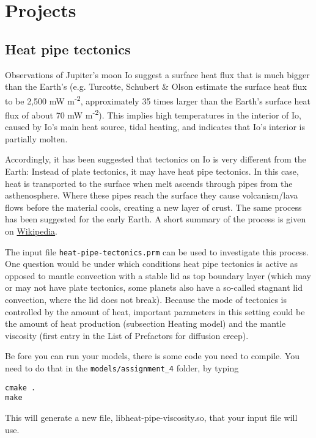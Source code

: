 \documentclass[notitlepage]{article}
\begin{document}
\section{Projects}

\subsection{Heat pipe tectonics}

Observations of Jupiter's moon Io suggest a surface heat flux that is much bigger than the Earth's 
(e.g. Turcotte, Schubert \& Olson estimate the surface heat flux to be 2,500 mW m\textsuperscript{-2},
approximately 35 times larger than the Earth's surface heat flux of about 70 mW m\textsuperscript{-2}).
This implies high temperatures in the interior of Io, caused by Io's main heat source, tidal heating,  
and indicates that Io's interior is partially molten. 

Accordingly, it has been suggested that tectonics on Io is very different from the Earth: 
Instead of plate tectonics, it may have heat pipe tectonics. In this case, heat is transported to the 
surface when melt ascends through pipes from the asthenosphere. Where these pipes reach the surface they cause volcanism/lava flows 
before the material cools, creating a new layer of crust. The same process has been suggested for the early Earth. 
A short summary of the process is given on \href{https://en.wikipedia.org/wiki/Heat-pipe_tectonics}{Wikipedia}.

The input file \texttt{heat-pipe-tectonics.prm} can be used to investigate this process. 
One question would be under which conditions heat pipe tectonics is active as opposed to mantle convection with 
a stable lid as top boundary layer (which may or may not have plate tectonics, some planets also have a so-called
stagnant lid convection, where the lid does not break). 
Because the mode of tectonics is controlled by the amount of heat, important parameters in this setting could be
the amount of heat production (subsection Heating model) and the mantle viscosity (first entry in the List of
Prefactors for diffusion creep). 

Be fore you can run your models, there is some code you need to compile. 
You need to do that in the \texttt{models/assignment\_4} folder, by typing
\begin{verbatim}
cmake .
make
\end{verbatim}
This will generate a new file, libheat-pipe-viscosity.so, that your input file will use. 
\end{document}
